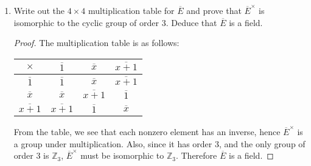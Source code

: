 \documentclass{article}
\begin{document}
\begin{enumerate}[label={\bf(\alph*)}]
    \item Write out the $4\times4$ multiplication table for $\overline{E}$
      and prove that $\overline{E}^\times$ is isomorphic to the cyclic
      group of order 3. Deduce that $\overline{E}$ is a field.
      \begin{proof}
        The multiplication table is as follows:
        \begin{center}
          \begin{tabular}{c|ccc}
            $\times$ & $\overline{1}$ & $\overline{x}$ &
              $\overline{x+1}$ \\
            \hline
            $\overline{1}$ & $\overline{1}$ & $\overline{x}$ &
              $\overline{x+1}$ \\
            $\overline{x}$ & $\overline{x}$ & $\overline{x+1}$ &
              $\overline{1}$ \\
            $\overline{x+1}$ & $\overline{x+1}$ & $\overline{1}$ &
              $\overline{x}$ \\
          \end{tabular}
        \end{center}
        From the table, we see that each nonzero element has an inverse,
        hence $\overline{E}^\times$ is a group under multiplication. Also,
        since it has order 3, and the only group of order 3 is
        $\mathbb{Z}_3$, $\overline{E}^\times$ must be isomorphic to
        $\mathbb{Z}_3$. Therefore $\overline{E}$ is a field.
      \end{proof}
  \end{enumerate}
\end{document}
